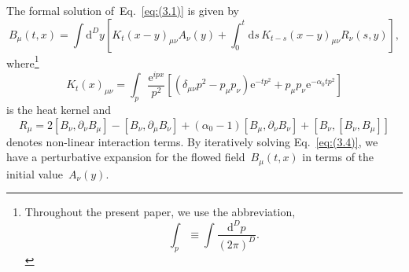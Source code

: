 The formal solution of~Eq.~\eqref{eq:(3.1)} is given
by~\cite{Luscher:2010iy,Luscher:2011bx}
\begin{equation}
   B_\mu(t,x)
   =\int\mathrm{d}^Dy\left[
   K_t(x-y)_{\mu\nu}A_\nu(y)
   +\int_0^t\mathrm{d}s\,K_{t-s}(x-y)_{\mu\nu}R_\nu(s,y)
   \right],
\label{eq:(3.4)}
\end{equation}
where\footnote{Throughout the present paper, we use the abbreviation,
\begin{equation}
   \int_p\equiv\int\frac{\mathrm{d}^Dp}{(2\pi)^D}.
\label{eq:(3.5)}
\end{equation}
}
\begin{equation}
   K_t(x)_{\mu\nu}=\int_p\frac{\mathrm{e}^{ipx}}{p^2}
   \left[(\delta_{\mu\nu}p^2-p_\mu p_\nu)\mathrm{e}^{-tp^2}
   +p_\mu p_\nu \mathrm{e}^{-\alpha_0tp^2}\right]
\label{eq:(3.6)}
\end{equation}
is the heat kernel and
\begin{equation}
   R_\mu=2[B_\nu,\partial_\nu B_\mu]
   -[B_\nu,\partial_\mu B_\nu]
   +(\alpha_0-1)[B_\mu,\partial_\nu B_\nu]
   +[B_\nu,[B_\nu,B_\mu]]
\label{eq:(3.7)}
\end{equation}
denotes non-linear interaction terms. By iteratively solving
Eq.~\eqref{eq:(3.4)}, we have a perturbative expansion for the flowed
field~$B_\mu(t,x)$ in terms of the initial value~$A_\nu(y)$.

